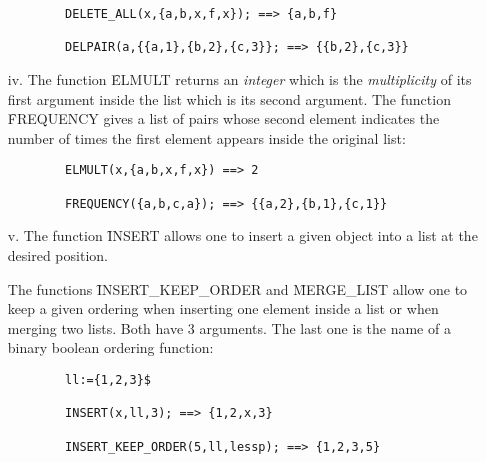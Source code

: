 \begin{itemize}
\begin{verbatim}
        DELETE_ALL(x,{a,b,x,f,x}); ==> {a,b,f}

        DELPAIR(a,{{a,1},{b,2},{c,3}}; ==> {{b,2},{c,3}}
\end{verbatim}
\item[iv.]
The function \f{ELMULT} returns an {\em integer} which is the
{\em multiplicity} of its first argument inside the list which is its
second argument.
The function \f{FREQUENCY} gives a list of pairs
whose second element indicates the number of times the first element
appears inside the original list:
\begin{verbatim}
        ELMULT(x,{a,b,x,f,x}) ==> 2

        FREQUENCY({a,b,c,a}); ==> {{a,2},{b,1},{c,1}}
\end{verbatim}
\item[v.]
The function \f{INSERT} allows one to insert a given object into a list
at the desired position.

The functions \f{INSERT\_KEEP\_ORDER} and \f{MERGE\_LIST} allow one to
keep a given ordering when inserting one element inside a list or
when merging two lists. Both have 3 arguments. The last one  is
the name of a binary boolean ordering function:
\begin{verbatim}
        ll:={1,2,3}$

        INSERT(x,ll,3); ==> {1,2,x,3}

        INSERT_KEEP_ORDER(5,ll,lessp); ==> {1,2,3,5}


\end{verbatim}
\end{itemize}
